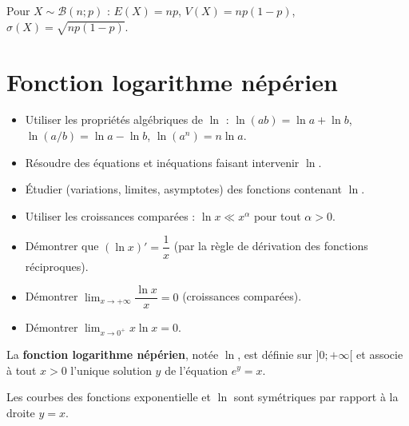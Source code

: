 \documentclass[11pt,a4paper,openany]{book}
\theoremstyle{definition}
\newcommand{\nchap}{
    \setcounter{Définition}{0}
    \setcounter{Propriété}{0}
    \setcounter{Théorème}{0}
    \setcounter{Remarque}{0}
    \setcounter{Exemple}{0}
}
\begin{document}
    \begin{Propriété}
        Pour $X\sim\mathcal{B}(n;p)$ : $E(X)=np$, $V(X)=np(1-p)$,
        $\sigma(X)=\sqrt{np(1-p)}$.
    \end{Propriété}

    \chapter{Fonction logarithme népérien}
    \nchap

    \begin{capacitesbox}
    \begin{itemize}
        \item Utiliser les propriétés algébriques de $\ln$ : $\ln(ab)=\ln a+\ln b$, $\ln(a/b)=\ln a-\ln b$, $\ln(a^n)=n\ln a$.
        \item Résoudre des équations et inéquations faisant intervenir $\ln$.
        \item Étudier (variations, limites, asymptotes) des fonctions contenant $\ln$.
        \item Utiliser les croissances comparées : $\ln x\ll x^\alpha$ pour tout $\alpha>0$.
    \end{itemize}
    \end{capacitesbox}

    \begin{demoprogbox}
    \begin{itemize}
        \item Démontrer que $(\ln x)'=\dfrac{1}{x}$ (par la règle de dérivation des fonctions réciproques).
        \item Démontrer $\displaystyle\lim_{x\to+\infty}\dfrac{\ln x}{x}=0$ (croissances comparées).
        \item Démontrer $\displaystyle\lim_{x\to 0^+}x\ln x=0$.
    \end{itemize}
    \end{demoprogbox}

    \begin{Définition}
        La \textbf{fonction logarithme népérien}, notée $\ln$, est définie sur $]0;+\infty[$
        et associe à tout $x>0$ l'unique solution $y$ de l'équation $e^y=x$.
    \end{Définition}

    \begin{Propriété}
        Les courbes des fonctions exponentielle et $\ln$ sont symétriques par rapport à la
        droite $y=x$.
    \end{Propriété}
\end{document}
